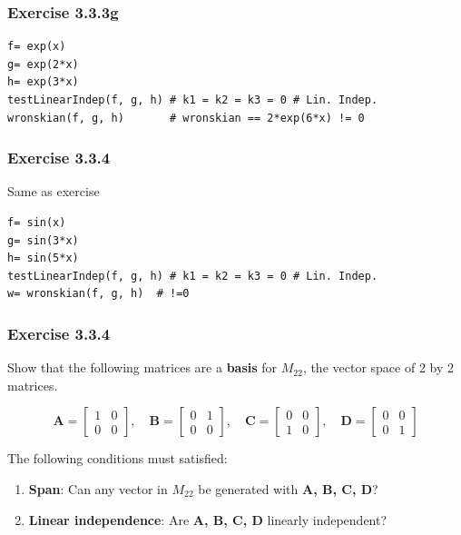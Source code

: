 \subsubsection{Exercise 3.3.3g}

\begin{verbatim}
f= exp(x)
g= exp(2*x)
h= exp(3*x)
testLinearIndep(f, g, h) # k1 = k2 = k3 = 0 # Lin. Indep.
wronskian(f, g, h)       # wronskian == 2*exp(6*x) != 0
\end{verbatim}

\subsubsection{Exercise 3.3.4}

Same as exercise 

\begin{verbatim}
f= sin(x)
g= sin(3*x)
h= sin(5*x)
testLinearIndep(f, g, h) # k1 = k2 = k3 = 0 # Lin. Indep.
w= wronskian(f, g, h)  # !=0
\end{verbatim}

\subsubsection{Exercise 3.3.4}

Show that the following matrices are a \textbf{basis} for $M_{22}$, the vector space of
2 by 2 matrices.

$$
\mathbf{A}= \left[\begin{matrix}1 & 0\\0 & 0\end{matrix}\right], \quad
\mathbf{B}= \left[\begin{matrix}0 & 1\\0 & 0\end{matrix}\right], \quad
\mathbf{C}= \left[\begin{matrix}0 & 0\\1 & 0\end{matrix}\right], \quad
\mathbf{D}= \left[\begin{matrix}0 & 0\\0 & 1\end{matrix}\right]
$$

The following conditions must satisfied:

\begin{enumerate}
\item \textbf{Span}: Can any vector in $M_{22}$ be generated with \textbf{A, B, C, D}?
\item \textbf{Linear independence}: Are \textbf{A, B, C, D} linearly independent?
\end{enumerate}

